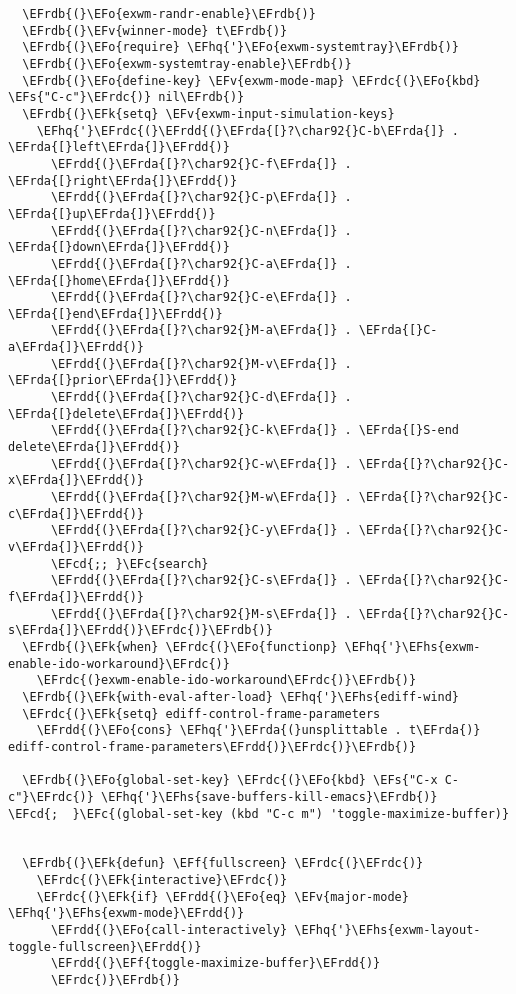 \documentclass[a4wide,10pt]{article}
\newcommand{\EFc}[1]{\textcolor{EFc}{#1}} %
\newcommand{\EFcd}[1]{\textcolor{EFcd}{#1}} %
\newcommand{\EFs}[1]{\textcolor{EFs}{#1}} %
\newcommand{\EFk}[1]{\textcolor{EFk}{#1}} %
\newcommand{\EFf}[1]{\textcolor{EFf}{#1}} %
\newcommand{\EFv}[1]{\textcolor{EFv}{#1}} %
\newcommand{\EFo}[1]{\textcolor{EFo}{#1}} %
\newcommand{\EFhq}[1]{\textcolor{EFhq}{#1}} %
\newcommand{\EFhs}[1]{\textcolor{EFhs}{#1}} %
\newcommand{\EFrda}[1]{\textcolor{EFrda}{#1}} %
\newcommand{\EFrdb}[1]{\textcolor{EFrdb}{#1}} %
\newcommand{\EFrdc}[1]{\textcolor{EFrdc}{#1}} %
\newcommand{\EFrdd}[1]{\textcolor{EFrdd}{#1}} %
\begin{document}
\begin{Code}
\begin{Verbatim}
  \EFrdb{(}\EFo{exwm-randr-enable}\EFrdb{)}
  \EFrdb{(}\EFv{winner-mode} t\EFrdb{)}
  \EFrdb{(}\EFo{require} \EFhq{'}\EFo{exwm-systemtray}\EFrdb{)}
  \EFrdb{(}\EFo{exwm-systemtray-enable}\EFrdb{)}
  \EFrdb{(}\EFo{define-key} \EFv{exwm-mode-map} \EFrdc{(}\EFo{kbd} \EFs{"C-c"}\EFrdc{)} nil\EFrdb{)}
  \EFrdb{(}\EFk{setq} \EFv{exwm-input-simulation-keys}
	\EFhq{'}\EFrdc{(}\EFrdd{(}\EFrda{[}?\char92{}C-b\EFrda{]} . \EFrda{[}left\EFrda{]}\EFrdd{)}
	  \EFrdd{(}\EFrda{[}?\char92{}C-f\EFrda{]} . \EFrda{[}right\EFrda{]}\EFrdd{)}
	  \EFrdd{(}\EFrda{[}?\char92{}C-p\EFrda{]} . \EFrda{[}up\EFrda{]}\EFrdd{)}
	  \EFrdd{(}\EFrda{[}?\char92{}C-n\EFrda{]} . \EFrda{[}down\EFrda{]}\EFrdd{)}
	  \EFrdd{(}\EFrda{[}?\char92{}C-a\EFrda{]} . \EFrda{[}home\EFrda{]}\EFrdd{)}
	  \EFrdd{(}\EFrda{[}?\char92{}C-e\EFrda{]} . \EFrda{[}end\EFrda{]}\EFrdd{)}
	  \EFrdd{(}\EFrda{[}?\char92{}M-a\EFrda{]} . \EFrda{[}C-a\EFrda{]}\EFrdd{)}
	  \EFrdd{(}\EFrda{[}?\char92{}M-v\EFrda{]} . \EFrda{[}prior\EFrda{]}\EFrdd{)}
	  \EFrdd{(}\EFrda{[}?\char92{}C-d\EFrda{]} . \EFrda{[}delete\EFrda{]}\EFrdd{)}
	  \EFrdd{(}\EFrda{[}?\char92{}C-k\EFrda{]} . \EFrda{[}S-end delete\EFrda{]}\EFrdd{)}
	  \EFrdd{(}\EFrda{[}?\char92{}C-w\EFrda{]} . \EFrda{[}?\char92{}C-x\EFrda{]}\EFrdd{)}
	  \EFrdd{(}\EFrda{[}?\char92{}M-w\EFrda{]} . \EFrda{[}?\char92{}C-c\EFrda{]}\EFrdd{)}
	  \EFrdd{(}\EFrda{[}?\char92{}C-y\EFrda{]} . \EFrda{[}?\char92{}C-v\EFrda{]}\EFrdd{)}
	  \EFcd{;; }\EFc{search}
	  \EFrdd{(}\EFrda{[}?\char92{}C-s\EFrda{]} . \EFrda{[}?\char92{}C-f\EFrda{]}\EFrdd{)}
	  \EFrdd{(}\EFrda{[}?\char92{}M-s\EFrda{]} . \EFrda{[}?\char92{}C-s\EFrda{]}\EFrdd{)}\EFrdc{)}\EFrdb{)}
  \EFrdb{(}\EFk{when} \EFrdc{(}\EFo{functionp} \EFhq{'}\EFhs{exwm-enable-ido-workaround}\EFrdc{)}
    \EFrdc{(}exwm-enable-ido-workaround\EFrdc{)}\EFrdb{)}
  \EFrdb{(}\EFk{with-eval-after-load} \EFhq{'}\EFhs{ediff-wind}
  \EFrdc{(}\EFk{setq} ediff-control-frame-parameters
	\EFrdd{(}\EFo{cons} \EFhq{'}\EFrda{(}unsplittable . t\EFrda{)} ediff-control-frame-parameters\EFrdd{)}\EFrdc{)}\EFrdb{)}

  \EFrdb{(}\EFo{global-set-key} \EFrdc{(}\EFo{kbd} \EFs{"C-x C-c"}\EFrdc{)} \EFhq{'}\EFhs{save-buffers-kill-emacs}\EFrdb{)}
\EFcd{;  }\EFc{(global-set-key (kbd "C-c m") 'toggle-maximize-buffer)}


  \EFrdb{(}\EFk{defun} \EFf{fullscreen} \EFrdc{(}\EFrdc{)}
    \EFrdc{(}\EFk{interactive}\EFrdc{)}
    \EFrdc{(}\EFk{if} \EFrdd{(}\EFo{eq} \EFv{major-mode} \EFhq{'}\EFhs{exwm-mode}\EFrdd{)}
      \EFrdd{(}\EFo{call-interactively} \EFhq{'}\EFhs{exwm-layout-toggle-fullscreen}\EFrdd{)}
      \EFrdd{(}\EFf{toggle-maximize-buffer}\EFrdd{)}
      \EFrdc{)}\EFrdb{)}


\end{Verbatim}
\end{Code}
\end{document}
